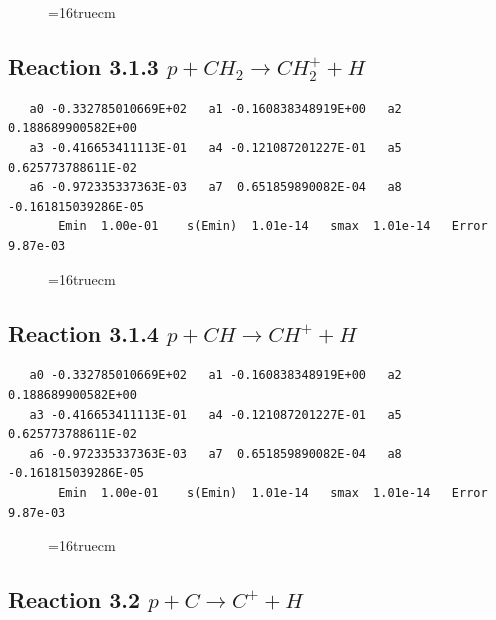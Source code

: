 \documentclass[12pt,dvipdfmx]{article}
\begin{document}
\begin{figure} \label{met.1_3.1.2}
\epsfxsize=16truecm
\end{figure}
\newpage

\subsection{
Reaction 3.1.3    $p + CH_2 \rightarrow CH_2^+ + H $
}

\begin{small}\begin{verbatim}
   a0 -0.332785010669E+02   a1 -0.160838348919E+00   a2  0.188689900582E+00
   a3 -0.416653411113E-01   a4 -0.121087201227E-01   a5  0.625773788611E-02
   a6 -0.972335337363E-03   a7  0.651859890082E-04   a8 -0.161815039286E-05
       Emin  1.00e-01    s(Emin)  1.01e-14   smax  1.01e-14   Error  9.87e-03
\end{verbatim}\end{small}

\begin{figure} \label{met.1_3.1.3}
\epsfxsize=16truecm
\end{figure}
\newpage


\subsection{
Reaction 3.1.4    $p + CH \rightarrow CH^+ + H $
}

\begin{small}\begin{verbatim}
   a0 -0.332785010669E+02   a1 -0.160838348919E+00   a2  0.188689900582E+00
   a3 -0.416653411113E-01   a4 -0.121087201227E-01   a5  0.625773788611E-02
   a6 -0.972335337363E-03   a7  0.651859890082E-04   a8 -0.161815039286E-05
       Emin  1.00e-01    s(Emin)  1.01e-14   smax  1.01e-14   Error  9.87e-03
\end{verbatim}\end{small}

\begin{figure} \label{met.1_3.1.4}
\epsfxsize=16truecm
\end{figure}
\newpage

\subsection{
Reaction 3.2      $p + C \rightarrow C^+ + H $
}
\end{document}
